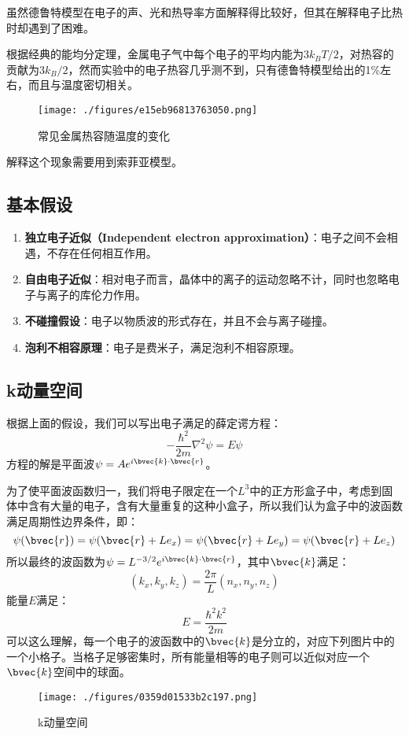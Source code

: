 

虽然德鲁特模型在电子的声、光和热导率方面解释得比较好，但其在解释电子比热时却遇到了困难。

根据经典的能均分定理，金属电子气中每个电子的平均内能为$3k_BT/2$，对热容的贡献为$3k_B/2$，然而实验中的电子热容几乎测不到，只有德鲁特模型给出的1\%左右，而且与温度密切相关。
\begin{figure}[ht]
\centering
\texttt{[image: ./figures/e15eb96813763050.png]}
\caption{常见金属热容随温度的变化} \label{fig_SMFM_1}
\end{figure}
解释这个现象需要用到索菲亚模型。
\subsection{基本假设}
\begin{enumerate}
\item \textbf{独立电子近似（Independent electron approximation）}：电子之间不会相遇，不存在任何相互作用。
\item \textbf{自由电子近似}：相对电子而言，晶体中的离子的运动忽略不计，同时也忽略电子与离子的库伦力作用。
\item \textbf{不碰撞假设}：电子以物质波的形式存在，并且不会与离子碰撞。
\item \textbf{泡利不相容原理}：电子是费米子，满足泡利不相容原理。
\end{enumerate}
\subsection{k动量空间}
根据上面的假设，我们可以写出电子满足的薛定谔方程：
\begin{equation}
-\frac{\hbar^2}{2m}\nabla^2\psi=E\psi
\end{equation}
方程的解是平面波$\psi=Ae^{i\bvec{k}\cdot \bvec{r}}$。

为了使平面波函数归一，我们将电子限定在一个$L^3$中的正方形盒子中，考虑到固体中含有大量的电子，含有大量重复的这种小盒子，所以我们认为盒子中的波函数满足周期性边界条件，即：
\begin{equation}
\psi(\bvec{r})=\psi(\bvec{r}+Le_x)=\psi(\bvec{r}+Le_y)=\psi(\bvec{r}+Le_z)
\end{equation}
所以最终的波函数为$\psi=L^{-3/2}e^{i\bvec{k}\cdot \bvec{r}}$，其中$\bvec{k}$满足：
\begin{equation}
\left (k_x, k_y, k_z\right )=\frac{2\pi}{L}\left(n_x, n_y, n_z\right )
\end{equation}
能量$E$满足：
\begin{equation}
E=\frac{\hbar ^2 k^2}{2m}
\end{equation}
可以这么理解，每一个电子的波函数中的$\bvec{k}$是分立的，对应下列图片中的一个小格子。当格子足够密集时，所有能量相等的电子则可以近似对应一个$\bvec{k}$空间中的球面。
\begin{figure}[ht]
\centering
\texttt{[image: ./figures/0359d01533b2c197.png]}
\caption{k动量空间} \label{fig_SMFM_2}
\end{figure}

